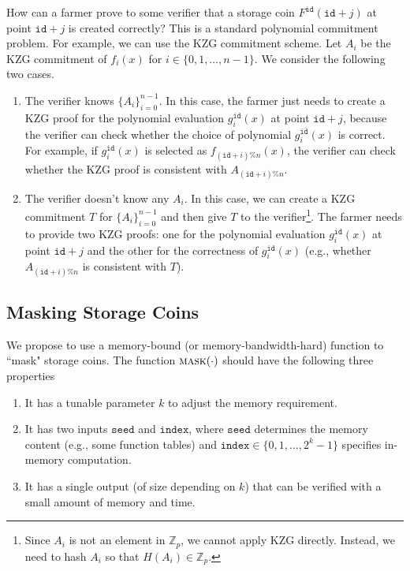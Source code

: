 \documentclass[12pt,draftcls,onecolumn]{IEEEtran}
\newcommand{\Fp}{\mathbb{Z}_p}
\newcommand{\id}{\texttt{id}}
\newcommand{\seed}{\texttt{seed}}
\newcommand{\ind}{\texttt{index}}
\newcommand{\mask}{\textsc{mask}}
\begin{document}
How can a farmer prove to some verifier that a storage coin $F^{\id}(\id + j)$ at point $\id + j$ is created correctly? This is a standard polynomial commitment problem. For example, we can use the
KZG commitment scheme. Let $A_i$ be the KZG commitment of $f_i(x)$ for $i \in \{0, 1, \ldots, n-1\}$. 
We consider the following two cases.
\begin{enumerate}
    \item The verifier knows $\{ A_i \}_{i = 0}^{n - 1}$. In this case, the farmer just needs to create a KZG proof for the polynomial evaluation $g_i^{\id}(x)$ at point $\id + j$, because the verifier can check whether the choice of polynomial $g_i^{\id}(x)$ is correct. For example, if $g_i^{\id}(x)$ is selected as $f_{(\id + i)\% n}(x)$, the verifier can check whether the KZG proof is consistent with $A_{(\id + i)\% n}$. 
    \item The verifier doesn't know any $A_i$. In this case, we can create a KZG commitment $T$ for $\{ A_i \}_{i = 0}^{n - 1}$ and then give $T$ to the verifier\footnote{Since $A_i$ is not an element in $\Fp$, we cannot apply KZG directly. Instead, we need to hash $A_i$ so that $H(A_i) \in \Fp$.}.  The farmer needs to provide two KZG proofs: one for the polynomial evaluation $g_i^{\id}(x)$ at point $\id + j$ and the other for the correctness of $g_i^{\id}(x)$ (e.g., whether $A_{(\id + i)\% n}$ is consistent with $T$).
\end{enumerate}


\subsection{Masking Storage Coins}

We propose to use a memory-bound (or memory-bandwidth-hard) function to ``mask" storage coins. The function $\mask(\cdot)$ should have the following three properties

\begin{enumerate}
    \item It has a tunable parameter $k$ to adjust the memory requirement. 
    \item It has two inputs $\seed$ and $\ind$, where $\seed$ determines the memory content (e.g., some function tables)
    and $\ind \in \{0, 1, \ldots, 2^k - 1 \}$ specifies in-memory computation.
    \item It has a single output (of size depending on $k$) that can be verified with a small amount of memory and time.
\end{enumerate}
\end{document}

